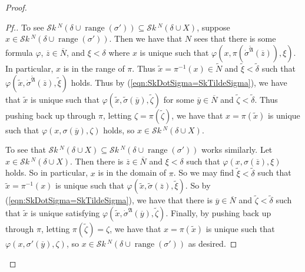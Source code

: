 \documentclass{amsart}
\theoremstyle{definition}
\theoremstyle{remark}
\newcommand{\N}{{\overline{N}}}
\DeclareMathOperator{\ran}{range}
\newcommand{\SH}{\mathcal{S}\textit{k} \,}
\newcommand{\sk}[3]{\SH^{#1}( {#2} \cup {\ran(#3)} ) }
\newcommand{\Sk}[3]{\SH^{#1}( {#2} \cup {#3} ) }
\begin{document}
\begin{proof}
\begin{proof}[Pf.]
To see $\sk{N}{\delta}{\sigma'} \subseteq \Sk{N}{\delta}{X}$, suppose $x \in \sk{N}{\delta}{\sigma'}$. Then we have that $N$ sees that there is some formula $\varphi$, $\overline z \in \N$, and $\xi < \delta$ where $x$ is unique such that $\varphi(x, \pi(\dot \sigma^{\tilde{\mathfrak A}}(\overline z)), \xi)$. In particular, $x$ is in the range of $\pi$. Thus $\tilde x = \pi^{-1}(x) \in \tilde N$ and $\tilde \xi < \tilde \delta$ such that $\varphi(\tilde x, \dot \sigma^{\tilde{\mathfrak A}}(\overline z), \tilde \xi)$ holds. Thus by (\ref{eqn:SkDotSigma=SkTildeSigma}), we have that $\tilde x$ is unique such that 
$\varphi(\tilde x, \tilde \sigma(\overline y), \tilde \zeta)$ for some $\overline y \in \N$ and $\tilde \zeta < \tilde \delta$. Thus pushing back up through $\pi$, letting $\zeta = \pi(\tilde \zeta)$, we have that $x = \pi(\tilde x)$ is unique such that $\varphi(x, \sigma(\overline y), \zeta)$ holds, so $x \in \Sk{N}{\delta}{X}$.

To see that $\Sk{N}{\delta}{X} \subseteq \sk{N}{\delta}{\sigma'}$ works similarly. Let $x \in \Sk{N}{\delta}{X}$. Then there is $\overline z \in \N$ and $\xi < \delta$ such that $\varphi(x, \sigma(\overline z), \xi)$ holds. So in particular, $x$ is in the domain of $\pi$. So we may find $\tilde \xi < \tilde \delta$ such that $\tilde x = \pi^{-1}(x)$ is unique such that $\varphi(\tilde x, \tilde \sigma(\overline z), \tilde \xi)$. So by (\ref{eqn:SkDotSigma=SkTildeSigma}), we have that there is $\overline y \in \N$ and $\tilde \zeta < \tilde \delta$ such that $\tilde x$ is unique satisfying $\varphi(\tilde x, \dot{\sigma}^{\mathfrak A}(\overline y), \tilde \zeta)$. Finally, by pushing back up through $\pi$, letting $\pi(\tilde \zeta) = \zeta$, we have that $x = \pi(\tilde x)$ is unique such that $\varphi(x, \sigma'(\overline y), \zeta)$, so $x \in \sk{N}{\delta}{\sigma'}$ as desired.



\end{proof}
\end{proof}
\end{document}
